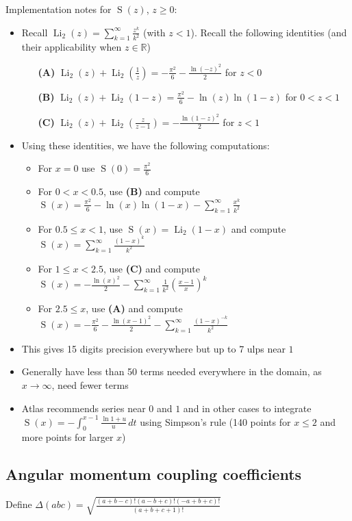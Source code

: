 \documentclass[10pt,dvipdfmx,letterpaper,twoside]{article}
\let\O=\operatorname
\newcommand{\RR}{{\mathbb{R}}}
\newenvironment{implementation}{\noindent\begin{framed}}{\end{framed}}
\begin{document}
\begin{implementation}
Implementation notes for $\O{S}(z)$, $z\geq0$:
\begin{itemize}
\item Recall $\O{Li}_2(z)=\sum_{k=1}^\infty\frac{z^k}{k^2}$ (with $z<1$). Recall the following identities (and their applicability when $z\in\RR$)
  \begin{itemize}
  \item [\bf(A)] $\O{Li}_2(z) + \O{Li}_2(\frac{1}{z}) = -\frac{\pi^2}{6} - \frac{\ln(-z)^2}{2}$ for $z<0$
  \item [\bf(B)] $\O{Li}_2(z) + \O{Li}_2(1-z) = \frac{\pi^2}{6} - \ln(z)\ln(1-z)$ for $0<z<1$
  \item [\bf(C)] $\O{Li}_2(z) + \O{Li}_2(\frac{z}{z-1}) = -\frac{\ln(1-z)^2}{2}$ for $z<1$
  \end{itemize}
\item Using these identities, we have the following computations:
  \begin{itemize}
  \item For $x=0$ use $\O{S}(0) = \frac{\pi^2}{6}$
  \item For $0<x<0.5$, use {\bf(B)} and compute $\O{S}(x) = \frac{\pi^2}{6} - \ln(x)\ln(1-x) - \sum_{k=1}^\infty \frac{x^k}{k^2}$
  \item For $0.5\leq x<1$, use $\O{S}(x)=\O{Li}_2(1-x)$ and compute $\O{S}(x) = \sum_{k=1}^\infty\frac{(1-x)^k}{k^2}$
  \item For $1\leq x<2.5$, use {\bf(C)} and compute $\O{S}(x) = -\frac{\ln(x)^2}{2} - \sum_{k=1}^\infty\frac{1}{k^2}\left(\frac{x-1}{x}\right)^k$
  \item For $2.5\leq x$, use {\bf(A)} and compute $\O{S}(x) = -\frac{\pi^2}{6} - \frac{\ln(x-1)^2}{2} - \sum_{k=1}^\infty \frac{(1-x)^{-k}}{k^2}$
  \end{itemize}
\item This gives 15 digits precision everywhere but up to 7 ulps near $1$
\item Generally have less than 50 terms needed everywhere in the domain, as $x\to\infty$, need fewer terms
\item Atlas recommends series near $0$ and $1$ and in other cases to integrate $\O{S}(x) = -\int_0^{x-1}\frac{\ln 1+u}{u}\,dt$ using Simpson's rule
  (140 points for $x\leq2$ and more points for larger $x$)
\end{itemize}
\end{implementation}

\subsection{Angular momentum coupling coefficients}
Define $\Delta(abc) = \sqrt{\frac{(a+b-c)!(a-b+c)!(-a+b+c)!}{(a+b+c+1)!}}$
\end{document}
